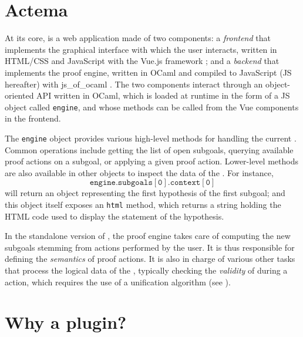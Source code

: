 \section{Actema}

At its core,  is a web application made of two components: a
\emph{frontend} that implements the graphical interface with which the user
interacts, written in HTML/CSS and JavaScript with the Vue.js framework
; and a \emph{backend} that implements the proof engine, written in
OCaml and compiled to JavaScript (JS hereafter) with js\_of\_ocaml
. The two components interact through an
object-oriented API written in OCaml, which is loaded at runtime in the form of
a JS object called \texttt{engine}, and whose methods can be called from the Vue
components in the frontend.

The \texttt{engine} object provides various high-level methods for handling the
current \emph{}. Common operations include getting the list of open
subgoals, querying available proof actions on a subgoal, or applying a given
proof action. Lower-level methods are also available in other objects to inspect
the data of the . For instance,
$$\mathtt{engine.subgoals[0].context[0]}$$
will return an object representing the first hypothesis of the first subgoal;
and this object itself exposes an \texttt{html} method, which returns a string
holding the HTML code used to display the statement of the hypothesis.


In the standalone version of , the proof engine takes care of computing
the new subgoals stemming from actions performed by the user. It is thus
responsible for defining the \emph{semantics} of proof actions. It is also in
charge of various other tasks that process the logical data of the ,
typically checking the \emph{validity} of  during a  action, which
requires the use of a unification algorithm (see ).

\section{Why a plugin?}

